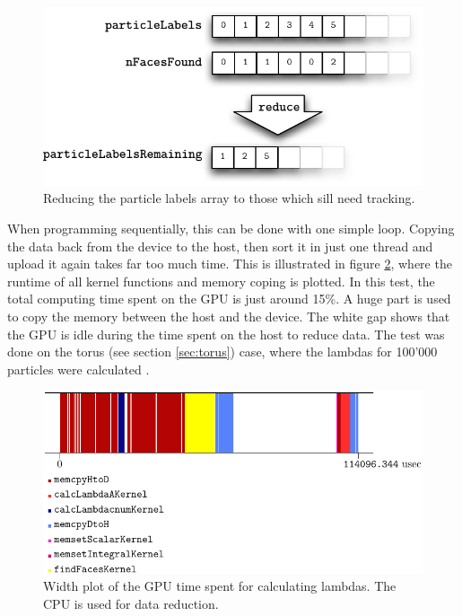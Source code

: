 \begin{figure}[H]
  \centering
  \includegraphics[scale=0.8]{content/gfx/reduce.pdf}
  \caption{Reducing the particle labels array to those which sill need tracking.}
  \label{gfx:reduce}
\end{figure}

When programming sequentially, this can be done with one simple loop. Copying the data back from the device to the host, then sort it in just one thread and upload it again takes far too much time. This is illustrated in figure \ref{gfx:widthPlotGapSort}, where the runtime of all kernel functions and memory coping is plotted. In this test, the total computing time spent on the GPU is just around 15\%. A huge part is used to copy the memory between the host and the device. The white gap shows that the GPU is idle during the time spent on the host to reduce data. The test was done on the torus (see section \ref{sec:torus}) case, where the lambdas for 100'000 particles were calculated .

\begin{figure}[H]
  \centering
  \includegraphics[scale=0.8]{content/gfx/widthPlotGapSort.pdf}
  \caption{Width plot of the GPU time spent for calculating lambdas. The CPU is used for data reduction.}
  \label{gfx:widthPlotGapSort}
\end{figure}

